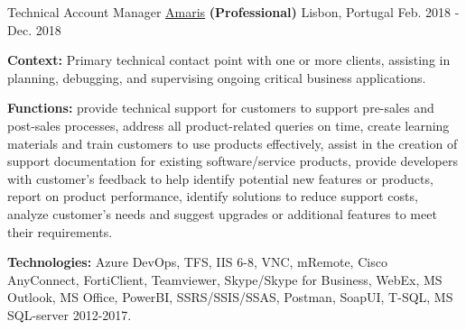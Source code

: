 \begin{cventries}


  \cventry
    {Technical Account Manager} %
    {\href{https://www.amaris.com/}{Amaris} \textbf{(Professional)}} %
    {Lisbon, Portugal} %
    {Feb. 2018 - Dec. 2018} %
    {
      \begin{cvitems} %
		\item {\textbf{Context:} Primary technical contact point with one or more clients, assisting in planning, debugging, and supervising ongoing critical business applications.}
		\item {\textbf{Functions:} provide technical support for customers to support pre-sales and post-sales processes, address all product-related queries on time, create learning materials and train customers to use products effectively, assist in the creation of support documentation for existing software/service products, provide developers with customer's feedback to help identify potential new features or products, report on product performance, identify solutions to reduce support costs, analyze customer's needs and suggest upgrades or additional features to meet their requirements.}		
		\item {\textbf{Technologies:} Azure DevOps, TFS, IIS 6-8, VNC, mRemote, Cisco AnyConnect, %
FortiClient, Teamviewer, Skype/Skype for Business, WebEx, MS Outlook, MS Office, PowerBI, SSRS/SSIS/SSAS, Postman, SoapUI, T-SQL, MS SQL-server 2012-2017.}		
      \end{cvitems}
    } 
    

\end{cventries}
